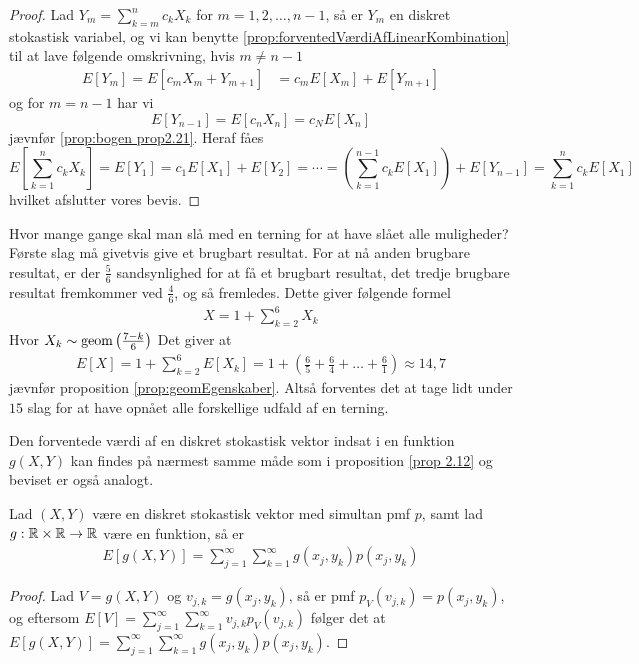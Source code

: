 \begin{proof}
    Lad $Y_m = \sum_{k = m}^n c_k X_k$ for $m = 1, 2, \ldots, n - 1$, så er $Y_m$ en diskret stokastisk variabel, og vi kan benytte \ref{prop:forventedVærdiAfLinearKombination} til at lave følgende omskrivning, hvis $m \neq n - 1$
    \begin{align*}
        E\left[Y_m\right] = E\left[c_m X_m + Y_{m + 1} \right] &= c_m E[X_m] + E[Y_{m + 1}] 
    \end{align*}
    og for $m = n - 1$ har vi
    \begin{equation*}
        E[Y_{n - 1}] = E[c_n X_n] = c_N E[X_n]
    \end{equation*}
    jævnfør \ref{prop:bogen prop2.21}. Heraf fåes 
    \begin{equation*}
        E\left[\sum^n_{k = 1} c_k X_k\right] = E[Y_1] = c_1 E[X_1] + E[Y_2] = \cdots = \left(\sum^{n - 1}_{k = 1} c_k E[X_1]\right) + E[Y_{n - 1}] = \sum^n_{k = 1} c_k E[X_1]
    \end{equation*}
    hvilket afslutter vores bevis.
\end{proof}
\begin{exmp} %
    Hvor mange gange skal man slå med en terning for at have slået alle muligheder?
    Første slag må givetvis give et brugbart resultat. For at nå anden brugbare resultat, er der  $\frac{5}{6}$ sandsynlighed for at få et brugbart resultat, det tredje brugbare resultat fremkommer ved $\frac{4}{6}$, og så fremledes. Dette giver følgende formel
    \begin{align*}
        X=1+\sum^{6}_{k=2}X_k
    \end{align*}
    Hvor $X_k\sim \textnormal{geom}\left(\frac{7-k}{6}\right)$
    Det giver at 
    \begin{align*}
        E[X]=1+\sum^{6}_{k=2}E[X_k] = 1+ \left(\frac{6}{5}+\frac{6}{4}+\dots+\frac{6}{1}\right) \approx 14,7
    \end{align*}
    jævnfør proposition \ref{prop:geomEgenskaber}. Altså forventes det at tage lidt under $15$ slag for at have opnået alle forskellige udfald af en terning.
\end{exmp}

Den forventede værdi af en diskret stokastisk vektor indsat i en funktion $g(X,Y)$ kan findes på nærmest samme måde som i proposition \ref{prop 2.12} og beviset er også analogt. 
\begin{prop} \label{prop:prop3.11}%
    Lad $(X,Y)$ være en diskret stokastisk vektor med simultan pmf $p$, samt lad $g:\mathbb{R} \times \mathbb{R} \to \mathbb{R}$ være en funktion, så er 
    \begin{align*}
        E[g(X,Y)]=\sum_{j=1}^\infty \sum_{k=1}^\infty g(x_j,y_k)p(x_j,y_k)
    \end{align*}
\end{prop}
\begin{proof}
Lad $V = g(X,Y)$ og $v_{j,k} = g(x_j,y_k)$, så er pmf $p_V(v_{j,k}) = p(x_j,y_k)$, og eftersom 
$E[V] = \sum_{j=1}^\infty \sum_{k=1}^\infty v_{j,k} p_V(v_{j,k})$
følger det at $E[g(X,Y)] = \sum_{j=1}^\infty \sum_{k=1}^\infty g(x_j,y_k) p(x_j,y_k)$.
\end{proof}

